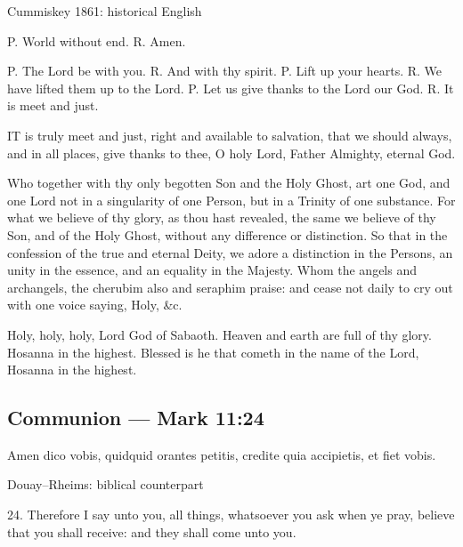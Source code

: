 \begin{englishwitness}{Cummiskey 1861: historical English}

P. World without end. R. Amen.

P. The Lord be with you. R. And with thy spirit. P. Lift up your hearts. R. We have lifted them up to the Lord. P. Let us give thanks to the Lord our God. R. It is meet and just.

IT is truly meet and just, right and available to salvation, that we should always, and in all places, give thanks to thee, O holy Lord, Father Almighty, eternal God.

Who together with thy only begotten Son and the Holy Ghost, art one God, and one Lord not in a singularity of one Person, but in a Trinity of one substance. For what we believe of thy glory, as thou hast revealed, the same we believe of thy Son, and of the Holy Ghost, without any difference or distinction. So that in the confession of the true and eternal Deity, we adore a distinction in the Persons, an unity in the essence, and an equality in the Majesty. Whom the angels and archangels, the cherubim also and seraphim praise: and cease not daily to cry out with one voice saying, Holy, \&c.

Holy, holy, holy, Lord God of Sabaoth. Heaven and earth are full of thy glory. Hosanna in the highest. Blessed is he that cometh in the name of the Lord, Hosanna in the highest.

\end{englishwitness}


\subsection{Communion --- Mark 11:24}

\label{proper-communion}


\begin{latinproper}

Amen dico vobis, quidquid orantes petitis, credite quia accipietis, et fiet vobis.

\end{latinproper}

\begin{englishwitness}{Douay--Rheims: biblical counterpart}

24. Therefore I say unto you, all things, whatsoever you ask when ye pray, believe that you shall receive: and they shall come unto you.

\end{englishwitness}

